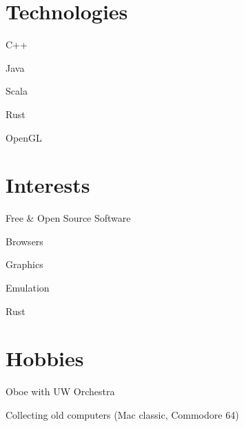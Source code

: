 \documentclass[12pt]{jmichaud-resume}
\begin{document}
	
\begin{minipage}[t]{0.29\textwidth}
\vspace{10pt}

\vspace{22pt}

\section{Technologies}
\vspace{7pt}
\begin{tightemize}
	\item C++
	\item Java
	\item Scala
	\item Rust
	\item OpenGL
\end{tightemize}

\vspace{15pt}

\section{Interests}
\vspace{7pt}
\begin{tightemize}
	\item Free \& Open Source Software
	\item Browsers
	\item Graphics
	\item Emulation
	\item Rust
\end{tightemize}

\vspace{20pt}

\section{Hobbies}
\vspace{7pt}
\begin{tightemize}
	\item Oboe with UW Orchestra
	\item Collecting old computers (Mac classic, Commodore 64)
\end{tightemize}


\end{minipage}
\end{document}
